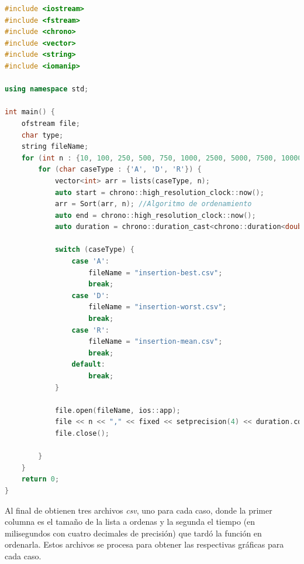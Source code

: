 \documentclass[14pt,a4paper]{report}
\begin{document}
\begin{lstlisting}[language=C++]
#include <iostream>
#include <fstream>
#include <chrono>
#include <vector>
#include <string>
#include <iomanip>

using namespace std;

int main() {
    ofstream file;
    char type;
    string fileName;
    for (int n : {10, 100, 250, 500, 750, 1000, 2500, 5000, 7500, 10000}) {
        for (char caseType : {'A', 'D', 'R'}) {
            vector<int> arr = lists(caseType, n);
            auto start = chrono::high_resolution_clock::now();
            arr = Sort(arr, n); //Algoritmo de ordenamiento
            auto end = chrono::high_resolution_clock::now();
            auto duration = chrono::duration_cast<chrono::duration<double, std::milli>>(end - start);

            switch (caseType) {
                case 'A':
                    fileName = "insertion-best.csv";
                    break;
                case 'D':
                    fileName = "insertion-worst.csv";
                    break;
                case 'R':
                    fileName = "insertion-mean.csv";
                    break;
                default:
                    break;
            }

            file.open(fileName, ios::app);
            file << n << "," << fixed << setprecision(4) << duration.count() << endl;
            file.close();

        }
    }
    return 0;
}
\end{lstlisting}
Al final de obtienen tres archivos \textit{csv}, uno para cada caso, donde la primer columna es el tamaño de la lista a ordenas y la segunda el tiempo (en milisegundos con cuatro decimales de precisión) que tardó la función en ordenarla. Estos archivos se procesa para obtener las respectivas gráficas para cada caso.
\newpage
\end{document}
